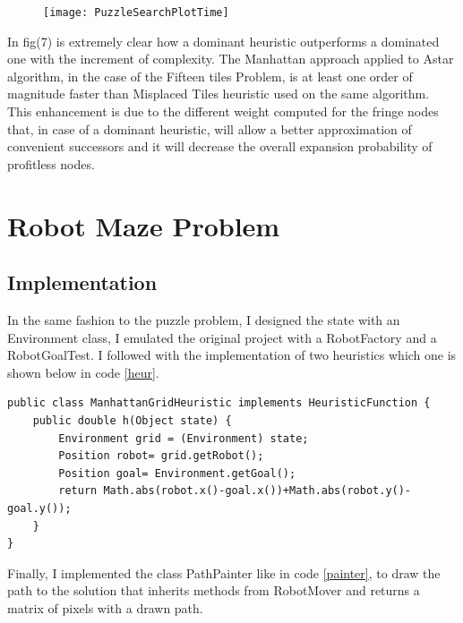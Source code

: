 \documentclass{article}
\begin{document}
\begin{center}
\begin{figure}
\centering
\texttt{[image: PuzzleSearchPlotTime]}
\caption{}
\label{fig:7}
\end{figure}
\end{center}
					In fig(7) is extremely clear how a dominant heuristic outperforms a dominated one with the increment of complexity.
					The Manhattan approach applied to Astar algorithm, in the case of the Fifteen tiles Problem, is at least one order of magnitude faster than Misplaced Tiles heuristic used on the same algorithm.\\
				 	This enhancement is due to the different weight computed for the fringe nodes that, in case of a dominant heuristic, will allow a better approximation of convenient successors and it will decrease the overall expansion probability of profitless nodes.
					
				\section{Robot Maze Problem}
				\subsection{Implementation}
				In the same fashion to the puzzle problem, I designed the state with an Environment class,  I emulated the original project with a RobotFactory and a RobotGoalTest. I followed with the implementation of two heuristics which one is shown below in code \ref{heur}.

							\begin{lstlisting}[caption= Manhattan Heuristic, label=heur]
	public class ManhattanGridHeuristic implements HeuristicFunction {
	public double h(Object state) {
		Environment grid = (Environment) state;
		Position robot= grid.getRobot();
		Position goal= Environment.getGoal();
		return Math.abs(robot.x()-goal.x())+Math.abs(robot.y()-goal.y());
	}
}
							\end{lstlisting}
				Finally, I implemented the class PathPainter like in code \ref{painter}, to draw the path to the solution that inherits methods from RobotMover and returns a matrix of pixels with a drawn path.
				
\end{document}
